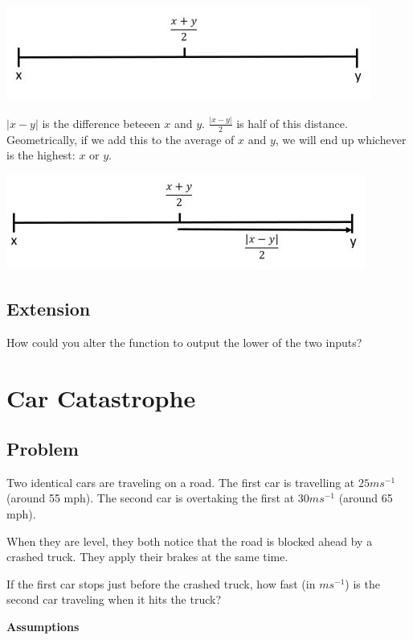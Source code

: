 \documentclass{book}
\begin{document}
\begin{center}
\includegraphics{function1}
\end{center}

\(|x-y|\) is the difference beteeen \(x\) and \(y\). \(\frac{|x-y|}{2}\) is half of this distance. Geometrically, if we add this to the average of \(x\) and \(y\), we will end up whichever is the highest: \(x\) or \(y\).

\begin{center}
\includegraphics{function2}
\end{center}

\subsection{Extension}
How could you alter the function to output the lower of the two inputs?
\newpage

\section{Car Catastrophe}
\subsection{Problem}
Two identical cars are traveling on a road. The first car is travelling at \(25ms^{-1}\) (around 55 mph). The second car is overtaking the first at \(30ms^{-1}\) (around 65 mph).

When they are level, they both notice that the road is blocked ahead by a crashed truck. They apply their brakes at the same time.

If the first car stops just before the crashed truck, how fast (in \(ms^{-1}\)) is the second car traveling when it hits the truck?

\textbf{Assumptions}
\end{document}
